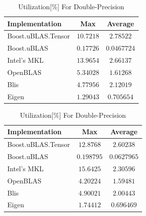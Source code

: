 \begin{table}[ht]
    \centering
    \caption{Utilization[\%] For Single-Precision}
    \begin{tabular}{|l|c|c|}
        \hline
        \textbf{Implementation} & \textbf{Max} & \textbf{Average}\\
        \hline
        Boost.uBLAS.Tensor  & $10.7218$& $2.78522$ \\
        \hline
        Boost.uBLAS         & $0.17726$& $0.0467724$ \\
        \hline
        Intel's MKL         & $13.9654$& $2.66137$ \\
        \hline
        OpenBLAS            & $5.34028$& $1.61268$ \\
        \hline
        Blis                & $4.77956$& $2.12019$ \\
        \hline
        Eigen               & $1.29043$& $0.705654$ \\
        \hline
    \end{tabular}

    \vspace*{1 cm}

    \centering
    \caption{Utilization[\%] For Double-Precision}
    \begin{tabular}{|l|c|c|}
        \hline
        \textbf{Implementation} & \textbf{Max} & \textbf{Average}\\
        \hline
        Boost.uBLAS.Tensor  & $12.8768$ & $2.60238$ \\
        \hline
        Boost.uBLAS         & $0.198795$ & $0.0627965$ \\
        \hline
        Intel's MKL         & $15.6425$ & $2.30596$ \\
        \hline
        OpenBLAS            & $4.20224$ & $1.59481$ \\
        \hline
        Blis                & $4.90021$ & $2.00443$ \\
        \hline
        Eigen               & $1.74412$ & $0.696469$ \\
        \hline
    \end{tabular}
\end{table}

